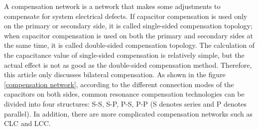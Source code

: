 A compensation network is a network that makes some adjustments to compensate for system electrical defects. If capacitor compensation is used only on the primary or secondary side, it is called single-sided compensation topology; when capacitor compensation is used on both the primary and secondary sides at the same time, it is called double-sided compensation topology. The calculation of the capacitance value of single-sided compensation is relatively simple, but the actual effect is not as good as the double-sided compensation method. Therefore, this article only discusses bilateral compensation. As shown in the figure \ref{compensation network}, according to the different connection modes of the capacitors on both sides, common resonance compensation technologies can be divided into four structures: S-S, S-P, P-S, P-P (S denotes series and P denotes parallel). In addition, there are more complicated compensation networks such as CLC and LCC.

